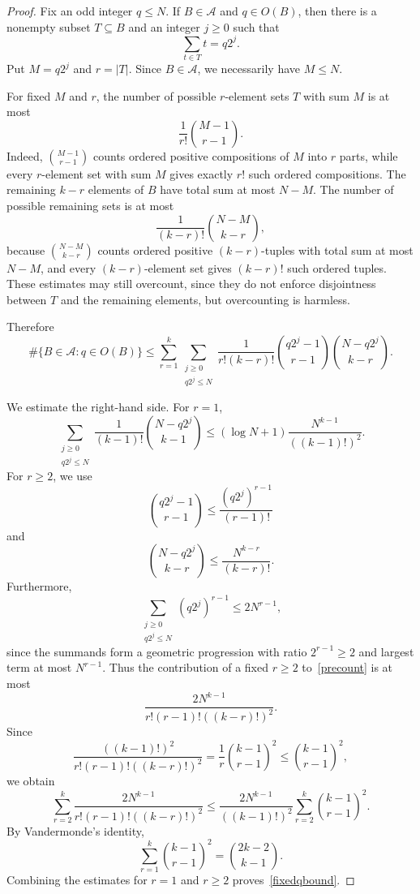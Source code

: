 \documentclass[12pt,a4paper,english,reqno]{amsart}
\theoremstyle{plain}
\theoremstyle{remark}
\newcommand{\A}{\mathcal{A}}
\begin{document}
\begin{proof}
Fix an odd integer $q\le N$. If $B\in\A$ and $q\in O(B)$, then there is a nonempty subset $T\subseteq B$ and an integer $j\ge0$ such that
\[
\sum_{t\in T}t=q2^j.
\]
Put $M=q2^j$ and $r=|T|$. Since $B\in\A$, we necessarily have $M\le N$.

For fixed $M$ and $r$, the number of possible $r$-element sets $T$ with sum $M$ is at most
\[
\frac1{r!}\binom{M-1}{r-1}.
\]
Indeed, $\binom{M-1}{r-1}$ counts ordered positive compositions of $M$ into $r$ parts, while every $r$-element set with sum $M$ gives exactly $r!$ such ordered compositions. The remaining $k-r$ elements of $B$ have total sum at most $N-M$. The number of possible remaining sets is at most
\[
\frac1{(k-r)!}\binom{N-M}{k-r},
\]
because $\binom{N-M}{k-r}$ counts ordered positive $(k-r)$-tuples with total sum at most $N-M$, and every $(k-r)$-element set gives $(k-r)!$ such ordered tuples. These estimates may still overcount, since they do not enforce disjointness between $T$ and the remaining elements, but overcounting is harmless.

Therefore
\begin{equation}\label{precount}
\#\{B\in\A:q\in O(B)\}
\le
\sum_{r=1}^{k}
\sum_{\substack{j\ge0\\q2^j\le N}}
\frac1{r!(k-r)!}
\binom{q2^j-1}{r-1}
\binom{N-q2^j}{k-r}.
\end{equation}

We estimate the right-hand side. For $r=1$,
\[
\sum_{\substack{j\ge0\\q2^j\le N}}
\frac1{(k-1)!}\binom{N-q2^j}{k-1}
\le
(\log N+1)\frac{N^{k-1}}{((k-1)!)^2}.
\]
For $r\ge2$, we use
\[
\binom{q2^j-1}{r-1}\le \frac{(q2^j)^{r-1}}{(r-1)!}
\]
and
\[
\binom{N-q2^j}{k-r}\le \frac{N^{k-r}}{(k-r)!}.
\]
Furthermore,
\[
\sum_{\substack{j\ge0\\q2^j\le N}}(q2^j)^{r-1}\le 2N^{r-1},
\]
since the summands form a geometric progression with ratio $2^{r-1}\ge2$ and largest term at most $N^{r-1}$. Thus the contribution of a fixed $r\ge2$ to~\eqref{precount} is at most
\[
\frac{2N^{k-1}}{r!(r-1)!((k-r)!)^2}.
\]
Since
\[
\frac{((k-1)!)^2}{r!(r-1)!((k-r)!)^2}
=
\frac1r\binom{k-1}{r-1}^2
\le
\binom{k-1}{r-1}^2,
\]
we obtain
\[
\sum_{r=2}^k
\frac{2N^{k-1}}{r!(r-1)!((k-r)!)^2}
\le
\frac{2N^{k-1}}{((k-1)!)^2}
\sum_{r=2}^k\binom{k-1}{r-1}^2.
\]
By Vandermonde's identity,
\[
\sum_{r=1}^k\binom{k-1}{r-1}^2=\binom{2k-2}{k-1}.
\]
Combining the estimates for $r=1$ and $r\ge2$ proves~\eqref{fixedqbound}.
\end{proof}
\end{document}
